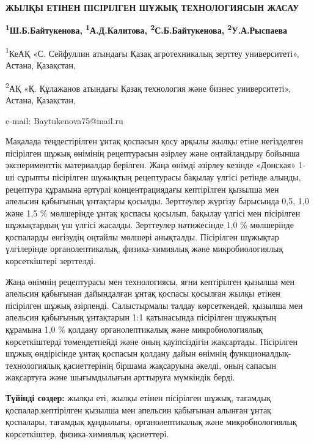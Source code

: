 \begin{articleheader}
{\bfseries ЖЫЛҚЫ ЕТІНЕН ПІСІРІЛГЕН ШҰЖЫҚ ТЕХНОЛОГИЯСЫН ЖАСАУ}

{\bfseries
\textsuperscript{1}Ш.Б.Байтукенова\textsuperscript{\envelope },
\textsuperscript{1}А.Д.Калитова,
\textsuperscript{2}С.Б.Байтукенова,
\textsuperscript{2}У.А.Рыспаева
}
\end{articleheader}

\begin{affiliation}
\textsuperscript{1}КеАҚ «С. Сейфуллин атындағы Қазақ агротехникалық
зерттеу университеті», Астана, Қазақстан,

\textsuperscript{2}АҚ «Қ. Құлажанов атындағы Қазақ технология және
бизнес университеті», Астана, Қазақстан,

e-mail: Baytukenova75@mail.ru
\end{affiliation}

Мақалада теңдестірілген ұнтақ қоспасын қосу арқылы жылқы етіне
негізделген пісірілген шұжық өнімінің рецептурасын әзірлеу және
оңтайландыру бойынша эксперименттік материалдар берілген. Жаңа өнімді
әзірлеу кезінде «Донская» 1-ші сұрыпты пісірілген шұжықтың рецептурасы
бақылау үлгісі ретінде алынды, рецептура құрамына әртүрлі
концентрациядағы кептірілген қызылша мен апельсин қабығының ұнтақтары
қосылды. Зерттеулер жүргізу барысында 0,5, 1,0 және 1,5 \% мөлшерінде
ұнтақ қоспасы қосылып, бақылау үлгісі мен пісірілген шұжықтардың үш
үлгісі жасалды. Зерттеулер нәтижесінде 1,0 \% мөлшерінде қоспаларды
енгізудің оңтайлы мөлшері анықталды. Пісірілген шұжықтар үлгілерінде
органолептикалық, физика-химиялық және микробиологиялық көрсеткіштері
зерттелді.

Жаңа өнімнің рецептурасы мен технологиясы, яғни кептірілген қызылша мен
апельсин қабығынан дайындалған ұнтақ қоспасы қосылған жылқы етінен
пісірілген шұжық әзірленді. Салыстырмалы талдау көрсеткендей, қызылша
мен апельсин қабығының ұнтақтарын 1:1 қатынасында пісірілген шұжықтың
құрамына 1,0 \% қолдану органолептикалық және микробиологиялық
көрсеткіштерді төмендетпейді және оның қауіпсіздігін жақсартады.
Пісірілген шұжық өндірісінде ұнтақ қоспасын қолдану дайын өнімнің
функционалдық-технологиялық қасиеттерінің біршама жақсаруына әкелді,
оның сапасын жақсартуға және шығымдылығын арттыруға мүмкіндік берді.

{\bfseries Түйінді сөздер:} жылқы еті, жылқы етінен пісірілген шұжық,
тағамдық қоспалар,кептірілген қызылша мен апельсин қабығынан алынған
ұнтақ қоспалары, тағамдық құндылығы, органолептикалық және
микробиологиялық көрсеткіштер, физика-химиялық қасиеттері.

